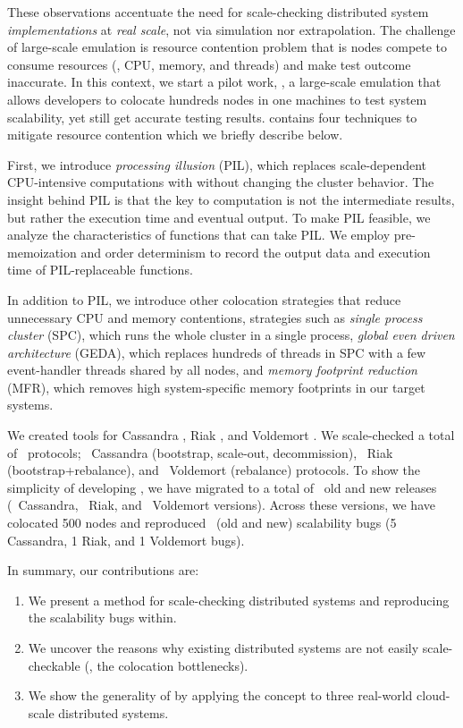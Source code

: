 These observations accentuate the need for scale-checking distributed system
{\em implementations} at {\em real scale}, not via simulation nor extrapolation.
The challenge of large-scale emulation is resource contention problem that is
nodes compete to consume resources (\eg, CPU, memory, and threads) and make test
outcome inaccurate.
%
In this context, we start a pilot work, \sck, a large-scale emulation that
allows developers to colocate hundreds nodes in one machines to test system
scalability, yet still get accurate testing results. \sck contains four
techniques to mitigate resource contention which we briefly describe below.

First, we introduce {\em processing illusion} (PIL), which replaces
scale-dependent CPU-intensive computations with \sleep without changing the
cluster behavior.  The insight behind PIL is that the key to computation is not
the intermediate results, but rather the execution time and eventual output.  To
make PIL feasible, we analyze the characteristics of functions that can take
PIL.  We employ pre-memoization and order determinism to record the output data
and execution time of PIL-replaceable functions.

In addition to PIL, we introduce other colocation strategies
that reduce unnecessary CPU and memory contentions, strategies such as
%
{\em single process cluster} (SPC), which runs the whole cluster
in a single process,
%
{\em global even driven architecture} (GEDA), which replaces
hundreds of threads in SPC with a few event-handler threads
shared by all nodes,
%
and {\em memory footprint reduction} (MFR), which removes high
system-specific memory footprints in our target systems.

We created \sck tools for Cassandra \cite{Lakshman+09-Cassandra}, Riak
\cite{RiakWeb}, and Voldemort \cite{VoldemortWeb}.
%
We scale-checked a total of \numProt\ protocols; \numProtCass\ Cassandra
(bootstrap, scale-out, decommission), \numProtRiak\ Riak (bootstrap+rebalance),
and \numProtVold\ Voldemort (rebalance) protocols.
%
To show the simplicity of developing \sck, we have migrated \sck to a total of
\numVers\ old and new releases (\numVersCass\ Cassandra, \numVersRiak\ Riak, and
\numVersVold\ Voldemort versions).
%
Across these versions, we have colocated 500 nodes and reproduced \numEval\ (old
and new) scalability bugs (5 Cassandra, 1 Riak, and 1 Voldemort bugs).

In summary, our contributions are:
%
\begin{enumerate} \item We present a method for scale-checking distributed
systems and reproducing the scalability bugs within.
%
\item We uncover the reasons why existing distributed systems are not easily
scale-checkable (\ie, the colocation bottlenecks).
%
\item We show the generality of \sck by applying the concept to three real-world
cloud-scale distributed systems.
%
\end{enumerate}

